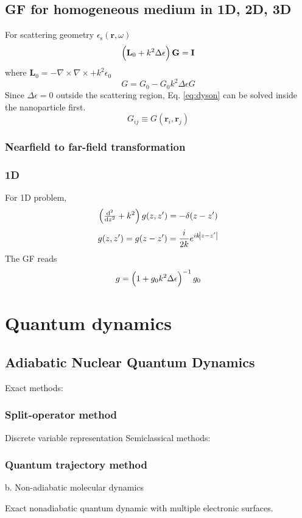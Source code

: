 \documentclass[a4paper,12pt]{book}
\newcommand{\eq}[1]{Eq. \eqref{#1}}
\renewcommand{\bf}[1]{\mathbf{#1}}
\newcommand{\grad}{\nabla}
\newcommand{\be}{\begin{equation}}
\newcommand{\ee}{\end{equation}}
\renewcommand{\bf}[1]{\mathbf{#1}}
\renewcommand{\bf}{\mathbf}
\begin{document}
 \section{GF for homogeneous medium in 1D, 2D, 3D}

 For scattering geometry $\epsilon_\text{s}(\bf r, \omega)$
 \be \del{\bf L_0 + k^2 \Delta \epsilon} \bf G = \bf I
 \ee
 where $ \bf L_0 = -\grad \times \grad \times + k^2 \epsilon_0 $
 \be
 G  = G_0 - G_0  k^2 \Delta \epsilon G
\label{eq:dyson}
 \ee
 Since $\Delta \epsilon = 0$ outside the scattering region, \eq{eq:dyson} can be solved inside the nanoparticle first.
 \be G_{ij} \equiv G(\bf r_i, \bf r_j) \ee

 \subsection{Nearfield to far-field transformation}

 \subsection{1D}
 For 1D problem,
 \be \del{ \od[2]{}{z} + k^2 } g(z,z') = -\delta(z-z')
 \ee
 \be g(z,z') = g(z-z') = \frac{i}{2k}e^{i k \abs{z-z'}}
 \ee
 The GF reads
 \be
 g = \del{1 + g_0k^2 \Delta \epsilon  }^{-1} g_0
 \ee


\chapter{Quantum dynamics}



\section{ Adiabatic Nuclear Quantum Dynamics}

Exact methods:

\subsection{Split-operator method}
Discrete variable representation
Semiclassical methods:

\subsection{Quantum trajectory method}
b. Non-adiabatic molecular dynamics

Exact nonadiabatic quantum dynamic with multiple electronic surfaces.
\end{document}

